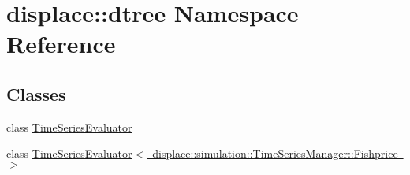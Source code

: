 \hypertarget{namespacedisplace_1_1dtree}{}\section{displace\+::dtree Namespace Reference}
\label{namespacedisplace_1_1dtree}
\subsection*{Classes}
\begin{DoxyCompactItemize}
\item 
class \mbox{\hyperlink{classdisplace_1_1dtree_1_1_time_series_evaluator}{Time\+Series\+Evaluator}}
\item 
class \mbox{\hyperlink{classdisplace_1_1dtree_1_1_time_series_evaluator_3_01displace_1_1simulation_1_1_time_series_manager_1_1_fishprice_01_4}{Time\+Series\+Evaluator$<$ displace\+::simulation\+::\+Time\+Series\+Manager\+::\+Fishprice $>$}}
\end{DoxyCompactItemize}
